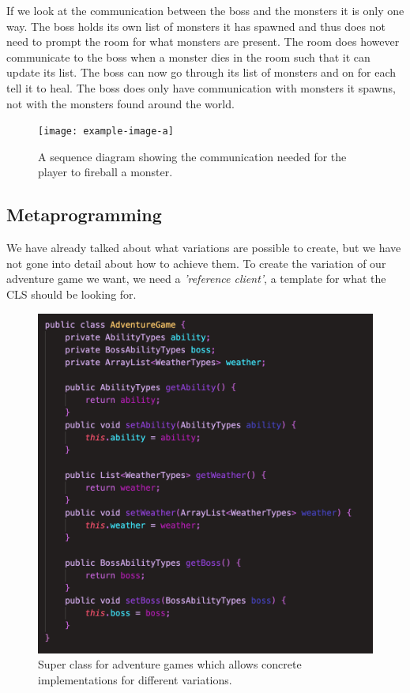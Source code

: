 If we look at the communication between the boss and the monsters it is only one way. The boss holds its own list of monsters it has spawned and thus does not need to prompt the room for what monsters are present. The room does however communicate to the boss when a monster dies in the room such that it can update its list. The boss can now go through its list of monsters and on for each tell it to heal. The boss does only have communication with monsters it spawns, not with the monsters found around the world.\\

\begin{figure}[H]
	\centering
	\texttt{[image: example-image-a]}
	\caption{A sequence diagram showing the communication needed for the player to fireball a monster.}
	\label{PLayerFireballFlow}
\end{figure}

\subsection{Metaprogramming} \label{Metalanguage}
We have already talked about what variations are possible to create, but we have not gone into detail about how to achieve them. To create the variation of our adventure game we want, we need a \textit{'reference client'}, a template for what the CLS should be looking for.
\begin{figure}
	\vspace{-10px}
	\centering
	\includegraphics[width=\linewidth]{Materials/Adventuregame/AdventureGame}
	\caption{Super class for adventure games which allows concrete implementations for different variations.}
	\label{MetalanguageAdventure}
\end{figure} 

